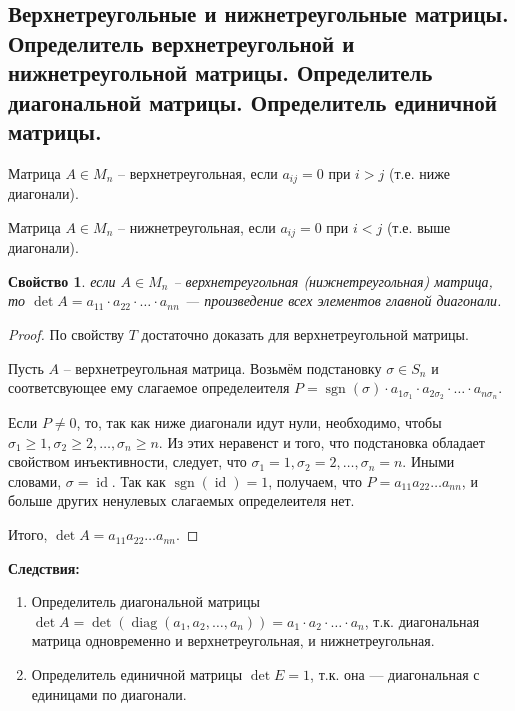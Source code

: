 \documentclass[a4paper, 12pt]{article}
\DeclareMathOperator{\sgn}{sgn}
\DeclareMathOperator{\id}{id}
\DeclareMathOperator{\diag}{diag}
\newtheorem*{que21prop}{Свойство}
\begin{document}
\subsection{Верхнетреугольные и нижнетреугольные матрицы. Определитель верхнетреугольной и нижнетреугольной матрицы. Определитель диагональной матрицы. Определитель единичной матрицы.}

Матрица $A \in  M_n$ – $\textit{верхнетреугольная}$, если
$a_{ij} = 0$  при  $i > j$  (т.е. ниже диагонали).

Матрица $A \in  M_n$ – $\textit{нижнетреугольная}$, если
$a_{ij} = 0$  при  $i < j$  (т.е. выше диагонали).

\begin{que21prop}
если  $A \in  M_n$ – верхнетреугольная (нижнетреугольная) матрица, то $\det A = a_{11} \cdot a_{22} \cdot \ldots \cdot a_{nn}$ --- произведение всех элементов главной диагонали.
\end{que21prop}

\begin{proof}
По свойству $T$ достаточно доказать для верхнетреугольной матрицы.

Пусть $A$ – верхнетреугольная матрица. Возьмём подстановку $\sigma \in S_n$ и соответсвующее ему слагаемое определеителя $P = \sgn(\sigma) \cdot a_{1\sigma_1} \cdot a_{2\sigma_2} \cdot \ldots \cdot a_{n\sigma_n}.$

Если $P \neq 0$, то, так как ниже диагонали идут нули, необходимо, чтобы $\sigma_1 \geq 1, \sigma_2 \geq 2, \ldots , \sigma_n \geq n$. Из этих неравенст и того, что подстановка обладает свойством инъективности, следует, что $\sigma_1 = 1, \sigma_2 = 2 , \ldots , \sigma_n = n$. Иными словами,
$\sigma  =\id$. Так как $\sgn (\id) = 1$, получаем, что $P = a_{11} a_{22} \ldots a_{nn}$, и больше других ненулевых слагаемых определеителя нет.

Итого, $\det A = a_{11} a_{22} \ldots a_{nn}$.
\end{proof}

\textbf{Следствия:}
\begin{enumerate}
\item Определитель диагональной матрицы $\det A = \det (\diag (a_1, a_2, \ldots , a_n)) = a_1 \cdot a_2 \cdot \ldots \cdot a_n$, т.к. диагональная матрица одновременно и верхнетреугольная, и нижнетреугольная. 
\item Определитель единичной матрицы  $\det E = 1$, т.к. она --- диагональная с единицами по диагонали.
\end{enumerate}
\end{document}
